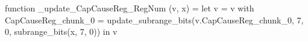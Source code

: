 function _update_CapCauseReg_RegNum (v, x) = let v = { v with CapCauseReg_chunk_0 = update_subrange_bits(v.CapCauseReg_chunk_0, 7, 0, subrange_bits(x, 7, 0)) } in
  v
